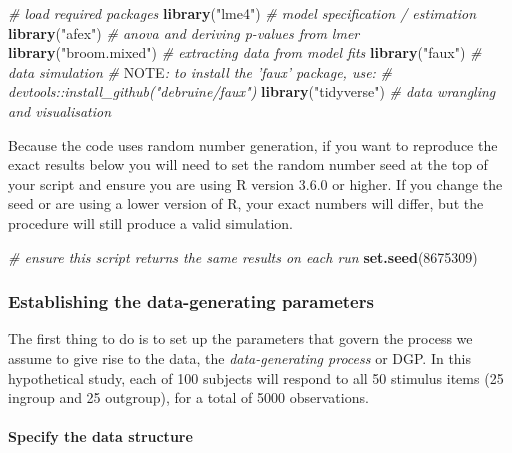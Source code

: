 \documentclass[man,floatsintext]{apa6}
\newenvironment{Shaded}{\begin{snugshade}}{\end{snugshade}}
\newcommand{\AlertTok}[1]{\textcolor[rgb]{0.94,0.16,0.16}{#1}}
\newcommand{\CommentTok}[1]{\textcolor[rgb]{0.56,0.35,0.01}{\textit{#1}}}
\newcommand{\DecValTok}[1]{\textcolor[rgb]{0.00,0.00,0.81}{#1}}
\newcommand{\KeywordTok}[1]{\textcolor[rgb]{0.13,0.29,0.53}{\textbf{#1}}}
\newcommand{\NormalTok}[1]{#1}
\newcommand{\StringTok}[1]{\textcolor[rgb]{0.31,0.60,0.02}{#1}}
\let\oldparagraph\paragraph
\renewcommand{\paragraph}[1]{\oldparagraph{#1}\mbox{}}
\begin{document}
\begin{Shaded}
\begin{Highlighting}[]
\CommentTok{# load required packages}
\KeywordTok{library}\NormalTok{(}\StringTok{"lme4"}\NormalTok{)        }\CommentTok{# model specification / estimation}
\KeywordTok{library}\NormalTok{(}\StringTok{"afex"}\NormalTok{)        }\CommentTok{# anova and deriving p-values from lmer}
\KeywordTok{library}\NormalTok{(}\StringTok{"broom.mixed"}\NormalTok{) }\CommentTok{# extracting data from model fits }
\KeywordTok{library}\NormalTok{(}\StringTok{"faux"}\NormalTok{)        }\CommentTok{# data simulation}
\CommentTok{# }\AlertTok{NOTE}\CommentTok{: to install the 'faux' package, use:}
\CommentTok{# devtools::install_github("debruine/faux")}
\KeywordTok{library}\NormalTok{(}\StringTok{"tidyverse"}\NormalTok{)   }\CommentTok{# data wrangling and visualisation}
\end{Highlighting}
\end{Shaded}

Because the code uses random number generation, if you want to reproduce the exact results below you will need to set the random number seed at the top of your script and ensure you are using R version 3.6.0 or higher. If you change the seed or are using a lower version of R, your exact numbers will differ, but the procedure will still produce a valid simulation.

\begin{Shaded}
\begin{Highlighting}[]
\CommentTok{# ensure this script returns the same results on each run}
\KeywordTok{set.seed}\NormalTok{(}\DecValTok{8675309}\NormalTok{)}
\end{Highlighting}
\end{Shaded}

\hypertarget{establishing-the-data-generating-parameters}{%
\subsubsection{Establishing the data-generating parameters}\label{establishing-the-data-generating-parameters}}

The first thing to do is to set up the parameters that govern the process we assume to give rise to the data, the \emph{data-generating process} or DGP. In this hypothetical study, each of 100 subjects will respond to all 50 stimulus items (25 ingroup and 25 outgroup), for a total of 5000 observations.

\hypertarget{specify-the-data-structure}{%
\paragraph{Specify the data structure}\label{specify-the-data-structure}}
\end{document}
